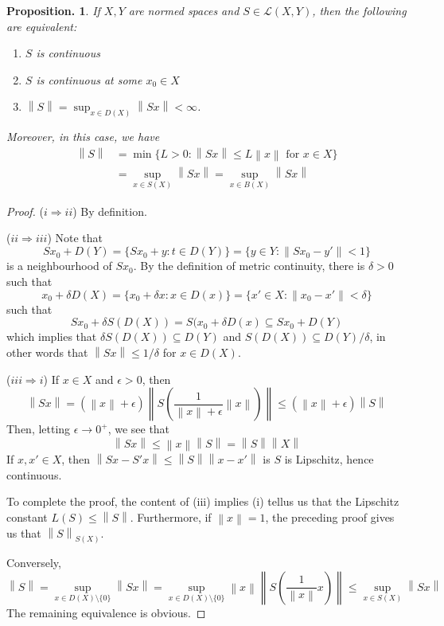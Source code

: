 \documentclass[11pt, a4paper]{memoir}
\newcommand{\imp}[2]{($#1\Rightarrow#2$)\hspace{0.2cm}}
\newcommand{\norm}[1]{\ensuremath{\left\lVert#1\right\rVert}}
\theoremstyle{change}
\newtheorem{proposition}[theorem]{Proposition.}
\theoremstyle{plain}
\theoremstyle{nonumberplain}
\newtheorem{proof}{Proof}
\numberwithin{equation}{section}
\begin{document}
\begin{proposition}
    If $X,Y$ are normed spaces and $S\in\mathcal{L}(X,Y)$, then the following are equivalent:
    \begin{enumerate}[nl,r]
        \item $S$ is continuous
        \item $S$ is continuous at some $x_0\in X$
        \item $\norm{S}=\sup_{x\in D(X)}\norm{Sx}<\infty$.
    \end{enumerate}
    Moreover, in this case, we have 
    \begin{align*}
        \norm{S}&=\min\{L>0:\norm{Sx}\leq L\norm{x}\text{ for }x\in X\}\\
                &= \sup_{x\in S(X)}\norm{Sx}=\sup_{x\in B(X)}\norm{Sx}
    \end{align*}
\end{proposition}
\begin{proof}
    \imp{i}{ii}
    By definition.

    \imp{ii}{iii}
    Note that
    \begin{equation*}
        Sx_0+D(Y) = \{Sx_0+y:t\in D(Y)\} = \{y\in Y:\norm{Sx_0-y'}<1\}
    \end{equation*}
    is a neighbourhood of $Sx_0$.
    By the definition of metric continuity, there is $\delta>0$ such that
    \begin{equation*}
        x_0+\delta D(X) = \{x_0+\delta x:x\in D(x)\}=\{x'\in X:\norm{x_0-x'}<\delta\}
    \end{equation*}
    such that
    \begin{equation*}
        Sx_0+\delta S(D(X)) = S(x_0+\delta D(x)\subseteq Sx_0+D(Y)
    \end{equation*}
    which implies that $\delta S(D(X))\subseteq D(Y)$ and $S(D(X))\subseteq D(Y)/\delta$, in other words that $\norm{Sx}\leq 1/\delta$ for $x\in D(X)$.

    \imp{iii}{i}
    If $x\in X$ and $\epsilon>0$, then
    \begin{equation*}
        \norm{Sx} = (\norm{x}+\epsilon)\norm{S\left(\frac{1}{\norm{x}+\epsilon}\norm{x}\right)}\leq(\norm{x}+\epsilon){\norm{S}}
    \end{equation*}
    Then, letting $\epsilon\to 0^+$, we see that
    \begin{equation*}
        \norm{Sx}\leq\norm{x}\norm{S}=\norm{S}\norm{X}
    \end{equation*}
    If $x,x'\in X$, then $\norm{Sx-S'x}\leq\norm{S}\norm{x-x'}$ is $S$ is Lipschitz, hence continuous.

    To complete the proof, the content of (iii) implies (i) tellus us that the Lipschitz constant $L(S)\leq\norm{S}$.
    Furthermore, if $\norm{x}=1$, the preceding proof gives us that $\norm{S}_{S(X)}$.

    Conversely,
    \begin{equation*}
        \norm{S} = \sup_{x\in D(X)\setminus\{0\}}\norm{Sx}=\sup_{x\in D(X)\setminus\{0\}}\norm{x}\norm{S\left(\frac{1}{\norm{x}}x\right)}\leq\sup_{x\in S(X)}\norm{Sx}
    \end{equation*}
    The remaining equivalence is obvious.
\end{proof}
\end{document}
